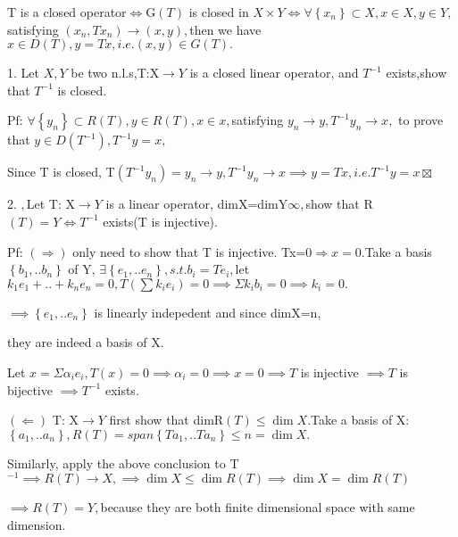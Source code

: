 \documentclass{article}
\begin{document}
\begin{CJK}{GBK}{song}

T is a closed operator$\iff $G$\left( T\right) $ is closed in $X\times Y\iff
\forall \left\{ x_{n}\right\} \subset X,x\in X,y\in Y,$satisfying $\left(
x_{n},Tx_{n}\right) \rightarrow \left( x,y\right) ,$then we have $x\in
D\left( T\right) ,y=Tx,i.e.\left( x,y\right) \in G\left( T\right) .$

\bigskip

1. Let $X,Y$ be two n.l.s,T:X$\rightarrow Y$ is a closed linear operator,
and $T^{-1}$ exists,show that $T^{-1}$ is closed.

Pf: $\forall \left\{ y_{n}\right\} \subset R\left( T\right) ,y\in R\left(
T\right) ,x\in x,$satisfying $y_{n}\rightarrow y,T^{-1}y_{n}\rightarrow x,$
to prove that $y\in D\left( T^{-1}\right) ,T^{-1}y=x,$

Since T is closed, T$\left( T^{-1}y_{n}\right) =y_{n}\rightarrow
y,T^{-1}y_{n}\rightarrow x\implies y=Tx,i.e.T^{-1}y=x\boxtimes $

2. $,$Let T: X$\rightarrow Y$ is a linear operator, dimX=dimY\TEXTsymbol{<}$%
\infty ,$show that R$\left( T\right) =Y\iff T^{-1}$ exists(T is injective).

Pf: $\left( \Longrightarrow \right) $ only need to show that T is injective.
Tx=0$\Longrightarrow x=0.$Take a basis $\left\{ b_{1},..b_{n}\right\} $ of
Y, $\exists \left\{ e_{1},..e_{n}\right\} ,s.t.b_{i}=Te_{i},$let $%
k_{1}e_{1}+..+k_{n}e_{n}=0,T\left( \sum k_{i}e_{i}\right) =0\implies \Sigma
k_{i}b_{i}=0\implies k_{i}=0.$

$\implies \left\{ e_{1},..e_{n}\right\} $ is linearly indepedent and since
dimX=n,

they are indeed a basis of X.

Let $x=\Sigma \alpha _{i}e_{i},T\left( x\right) =0\implies \alpha
_{i}=0\implies x=0\implies T$ is injective $\implies T$ is bijective $%
\implies T^{-1}$ exists.

$\left( \Longleftarrow \right) $ T: X$\rightarrow Y$ first show that dimR$%
\left( T\right) \leq \dim X.$Take a basis of X:$\left\{
a_{1},..a_{n}\right\} ,R\left( T\right) =span\left\{ Ta_{1},..Ta_{n}\right\}
\leq n=\dim X.$

Similarly, apply the above conclusion to T$^{-1}\implies R\left( T\right)
\rightarrow X,\implies \dim X\leq \dim R\left( T\right) \implies \dim X=\dim
R\left( T\right) $

$\implies R\left( T\right) =Y,$because they are both finite dimensional
space with same dimension.


\end{CJK}
\end{document}
